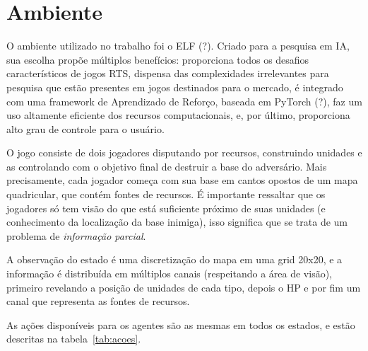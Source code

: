 \chapter{Ambiente}
\label{cap:ambiente}

O ambiente utilizado no trabalho foi o ELF (?).
Criado para a pesquisa em IA, sua escolha propõe múltiplos benefícios: 
proporciona todos os desafios característicos de jogos RTS,
dispensa das complexidades irrelevantes para pesquisa que estão presentes em jogos destinados para o mercado,
é integrado com uma framework de Aprendizado de Reforço, baseada em PyTorch (?),
faz um uso altamente eficiente dos recursos computacionais,
e, por último, proporciona alto grau de controle para o usuário.

O jogo consiste de dois jogadores 
disputando por recursos, 
construindo unidades 
e as controlando 
com o objetivo final de destruir a base do adversário.
Mais precisamente, 
cada jogador começa com sua base em cantos opostos de um mapa quadricular,
que contém fontes de recursos. 
É importante ressaltar que os jogadores só tem visão do que está suficiente próximo de suas unidades 
(e conhecimento da localização da base inimiga), isso significa que se trata de um problema de \textit{informação parcial}.

A observação do estado é uma discretização do mapa em uma grid 20x20,
e a informação é distribuída em múltiplos canais (respeitando a área de visão), 
primeiro revelando a posição de unidades de cada tipo, 
depois o HP 
e por fim um canal que representa as fontes de recursos.

As ações disponíveis para os agentes são as mesmas em todos os estados, e estão descritas na tabela~\ref{tab:acoes}.

